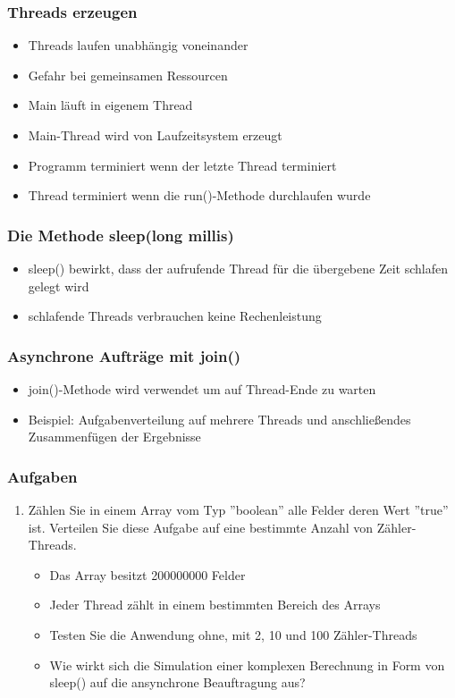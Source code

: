\begin{frame}
\frametitle{Threads erzeugen}
	\begin{itemize}
	  \item Threads laufen unabhängig voneinander
	  \item Gefahr bei gemeinsamen Ressourcen
	  \item Main läuft in eigenem Thread
	  \item Main-Thread wird von Laufzeitsystem erzeugt
	  \item Programm terminiert wenn der letzte Thread terminiert
	  \item Thread terminiert wenn die run()-Methode durchlaufen wurde
	\end{itemize}
\end{frame}

\begin{frame}
\frametitle{Die Methode sleep(long millis)}
	\begin{itemize}
	  \item sleep() bewirkt, dass der aufrufende Thread für die übergebene Zeit
	  schlafen gelegt wird
	  \item schlafende Threads verbrauchen keine Rechenleistung
	\end{itemize}
\end{frame}

\begin{frame}[fragile]
	\frametitle{Asynchrone Aufträge mit join()}
	\begin{itemize}
	  \item join()-Methode wird verwendet um auf Thread-Ende zu warten
	  \item Beispiel: Aufgabenverteilung auf mehrere Threads und anschließendes
	  Zusammenfügen der Ergebnisse
	\end{itemize}
\end{frame}

\begin{frame}
	\frametitle{Aufgaben}
	\begin{enumerate}
	  \item Zählen Sie in einem Array vom Typ ''boolean'' alle Felder deren Wert
	  ''true'' ist. Verteilen Sie diese Aufgabe auf eine bestimmte Anzahl von
	  Zähler-Threads.\\
	  \begin{itemize}
	    \item Das Array besitzt 200000000 Felder
	    \item Jeder Thread zählt in einem bestimmten Bereich des Arrays
	    \item Testen Sie die Anwendung ohne, mit 2, 10 und 100 Zähler-Threads
	    \item Wie wirkt sich die Simulation einer komplexen Berechnung in Form von
	    sleep() auf die ansynchrone Beauftragung aus?
	  \end{itemize}
	\end{enumerate}
\end{frame}

